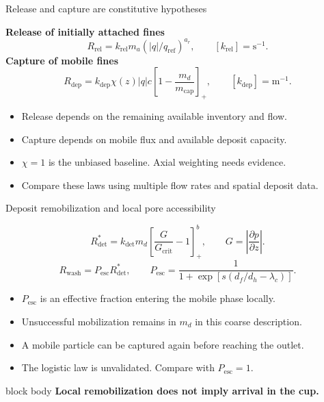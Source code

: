 \documentclass[aspectratio=169,11pt]{beamer}
\newcommand{\hi}[1]{\textcolor{tumblue}{\textbf{#1}}}
\newcommand{\takeaway}[1]{%
  \begin{beamercolorbox}[rounded=true,sep=.55em]{block body}
    \centering\color{tumdark}\textbf{#1}
  \end{beamercolorbox}}
\begin{document}
\begin{frame}{Release and capture are constitutive hypotheses}
\small

\hi{Release of initially attached fines}
\[
R_{\mathrm{rel}}=k_{\mathrm{rel}}m_a(|q|/q_{\mathrm{ref}})^{a_r},
\qquad [k_{\mathrm{rel}}]=\mathrm{s^{-1}}.
\]
\hi{Capture of mobile fines}
\[
R_{\mathrm{dep}}=k_{\mathrm{dep}}\chi(z)|q|c
\left[1-\frac{m_d}{m_{\mathrm{cap}}}\right]_+,
\qquad[k_{\mathrm{dep}}]=\mathrm{m^{-1}}.
\]
\begin{itemize}
\item Release depends on the remaining available inventory and flow.
\item Capture depends on mobile flux and available deposit capacity.
\item $\chi=1$ is the unbiased baseline. Axial weighting needs evidence.
\item Compare these laws using multiple flow rates and spatial deposit data.
\end{itemize}

\end{frame}

\begin{frame}{Deposit remobilization and local pore accessibility}
\small

\[
R_{\mathrm{det}}^*=k_{\mathrm{det}}m_d
\left[\frac{G}{G_{\mathrm{crit}}}-1\right]_+^b,
\qquad G=\left|\frac{\partial p}{\partial z}\right|.
\]
\[
R_{\mathrm{wash}}=P_{\mathrm{esc}}R_{\mathrm{det}}^*,\qquad
P_{\mathrm{esc}}=\frac{1}{1+\exp[s(d_f/d_h-\lambda_c)]}.
\]
\begin{itemize}
\item $P_{\mathrm{esc}}$ is an effective fraction entering the mobile phase locally.
\item Unsuccessful mobilization remains in $m_d$ in this coarse description.
\item A mobile particle can be captured again before reaching the outlet.
\item The logistic law is unvalidated. Compare with $P_{\mathrm{esc}}=1$.
\end{itemize}
\takeaway{Local remobilization does not imply arrival in the cup.}

\end{frame}
\end{document}
